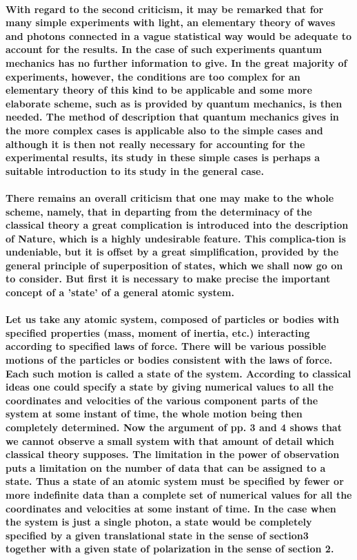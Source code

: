\documentclass[10pt, kindle, oneside]{kindle}
\begin{document}
\paragraph{With regard to the second criticism, it may be remarked that for many simple experiments with light, an elementary theory of waves and photons connected in a vague statistical way would be adequate to account for the results. In the case of such experiments quantum mechanics has no further information to give. In the great majority of experiments, however, the conditions are too complex for an elementary theory of this kind to be applicable and some more elaborate scheme, such as is provided by quantum mechanics, is then needed. The method of description that quantum mechanics gives in the more complex cases is applicable also to the simple cases and although it is then not really necessary for accounting for the experimental results, its study in these simple cases is perhaps a suitable introduction to its study in the general case.}
\paragraph{There remains an overall criticism that one may make to the whole scheme, namely, that in departing from the determinacy of the classical theory a great complication is introduced into the description of Nature, which is a highly undesirable feature. This complica-tion is undeniable, but it is offset by a great simplification, provided by the general principle of superposition of states, which we shall now go on to consider. But first it is necessary to make precise the important concept of a 'state' of a general atomic system.}
\paragraph{Let us take any atomic system, composed of particles or bodies with specified properties (mass, moment of inertia, etc.) interacting according to specified laws of force. There will be various possible motions of the particles or bodies consistent with the laws of force. Each such motion is called a state of the system. According to classical ideas one could specify a state by giving numerical values to all the coordinates and velocities of the various component parts of the system at some instant of time, the whole motion being then completely determined. Now the argument of pp. 3 and 4 shows that we cannot observe a small system with that amount of detail which classical theory supposes. The limitation in the power of observation puts a limitation on the number of data that can be assigned to a state. Thus a state of an atomic system must be specified by fewer or more indefinite data than a complete set of numerical values for all the coordinates and velocities at some instant of time. In the case when the system is just a single photon, a state would be completely specified by a given translational state in the sense of section3 together with a given state of polarization in the sense of section 2.}
\end{document}

